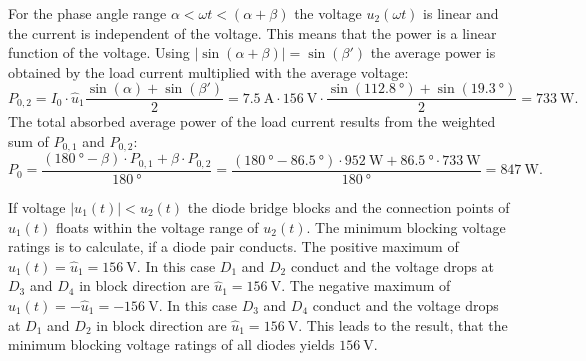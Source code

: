 \begin{solutionblock}
    For the phase angle range $\alpha<\omega t<(\alpha+\beta)$ the voltage $u_\mathrm{2}(\omega t)$ is linear and the current is independent of the voltage.
    This means that the power is a linear function of the voltage. Using $\left|\sin(\alpha+\beta)\right|=\sin(\beta')$ the average power is obtained by the load current multiplied
    with the average voltage:
    \begin{equation} 
        P_\mathrm{0,2}=I_{\mathrm{0}} \cdot \hat{u}_\mathrm{1}\frac{\sin(\alpha) + \sin(\beta')}{2}=
        \SI{7.5}{\ampere} \cdot \SI{156}{\volt} \cdot \frac{\sin(\SI{112.8}{\degree}) + \sin(\SI{19.3}{\degree})}{2}=
        \SI{733}{\watt}.
    \end{equation}
    The total absorbed average power of the load current results from the weighted sum of $P_\mathrm{0,1}$ and $P_\mathrm{0,2}$:
    \begin{equation} 
        P_\mathrm{0}=\frac{(\SI{180}{\degree}-\beta) \cdot P_\mathrm{0,1}+ \beta \cdot P_\mathrm{0,2}}{\SI{180}{\degree}}
        =\frac{(\SI{180}{\degree}-\SI{86.5}{\degree}) \cdot \SI{952}{\watt}+\SI{86.5}{\degree} \cdot \SI{733}{\watt}}{\SI{180}{\degree}}=\SI{847}{\watt}.
    \end{equation}
    
\end{solutionblock}

\begin{solutionblock}
    If voltage $\left| u_\mathrm{1}(t) \right| < u_\mathrm{2}(t)$ the diode bridge blocks and the connection points of $u_\mathrm{1}(t)$
    floats within the voltage range of $u_\mathrm{2}(t)$. The minimum blocking voltage ratings is to calculate, if a diode pair conducts.
    The positive maximum of ${u}_\mathrm{1}(t)=\hat{u}_\mathrm{1}=\SI{156}{\volt}$. In this case $D_\mathrm{1}$
    and $D_\mathrm{2}$ conduct and the voltage drops at $D_\mathrm{3}$ and $D_\mathrm{4}$ in block direction are $\hat{u}_\mathrm{1}=\SI{156}{\volt}$.
    The negative maximum of ${u}_\mathrm{1}(t)=-\hat{u}_\mathrm{1}=-\SI{156}{\volt}$. In this case $D_\mathrm{3}$
    and $D_\mathrm{4}$ conduct and the voltage drops at $D_\mathrm{1}$ and $D_\mathrm{2}$ in block direction are $\hat{u}_\mathrm{1}=\SI{156}{\volt}$.
    This leads to the result, that the minimum blocking voltage ratings of all diodes yields $\SI{156}{\volt}$.
\end{solutionblock}

